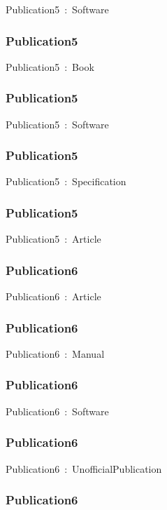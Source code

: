 \documentclass{article}
\begin{document}
Publication5~:~Software

\subsubsection*{Publication5}

Publication5~:~Book

\subsubsection*{Publication5}

Publication5~:~Software

\subsubsection*{Publication5}

Publication5~:~Specification

\subsubsection*{Publication5}

Publication5~:~Article

\subsubsection*{Publication6}

Publication6~:~Article

\subsubsection*{Publication6}

Publication6~:~Manual

\subsubsection*{Publication6}

Publication6~:~Software

\subsubsection*{Publication6}

Publication6~:~UnofficialPublication

\subsubsection*{Publication6}
\end{document}
